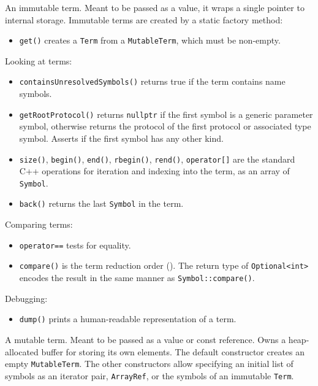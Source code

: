 \documentclass[../generics]{subfiles}
\begin{document}
An immutable term. Meant to be passed as a value, it wraps a single pointer to internal storage. Immutable terms are created by a static factory method:
\begin{itemize}
\item \texttt{get()} creates a \texttt{Term} from a \texttt{MutableTerm}, which must be non-empty.
\end{itemize}
Looking at terms:
\begin{itemize}
\item \texttt{containsUnresolvedSymbols()} returns true if the term contains name symbols.
\item \texttt{getRootProtocol()} returns \texttt{nullptr} if the first symbol is a generic parameter symbol, otherwise returns the protocol of the first protocol or associated type symbol. Asserts if the first symbol has any other kind.
\item \texttt{size()}, \texttt{begin()}, \texttt{end()}, \texttt{rbegin()}, \texttt{rend()}, \texttt{operator[]} are the standard C++ operations for iteration and indexing into the term, as an array of \texttt{Symbol}.
\item \texttt{back()} returns the last \texttt{Symbol} in the term.
\end{itemize}
Comparing terms:
\begin{itemize}
\item \texttt{operator==} tests for equality.
\item \texttt{compare()} is the term reduction order (). The return type of \texttt{Optional<int>} encodes the result in the same manner as \texttt{Symbol::compare()}.
\end{itemize}
Debugging:
\begin{itemize}
\item \texttt{dump()} prints a human-readable representation of a term.
\end{itemize}

A mutable term. Meant to be passed as a value or const reference. Owns a heap-allocated buffer for storing its own elements. The default constructor creates an empty \texttt{MutableTerm}. The other constructors allow specifying an initial list of symbols as an iterator pair, \texttt{ArrayRef}, or the symbols of an immutable \texttt{Term}.
\end{document}
